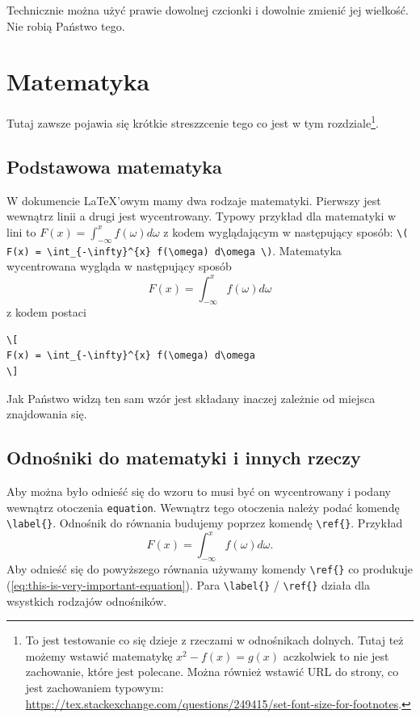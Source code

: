 \documentclass[polish, twoside, 12pt, a4paper]{article}
\theoremstyle{definition}
\theoremstyle{plain}
\theoremstyle{remark}
\begin{document}
Technicznie można użyć prawie dowolnej czcionki i dowolnie zmienić jej wielkość. Nie robią Państwo tego.

\clearpage
\section{Matematyka}

Tutaj zawsze pojawia się krótkie streszzcenie tego co jest w tym rozdziale\footnote{To jest testowanie co się dzieje z rzeczami w odnośnikach dolnych. Tutaj też możemy wstawić matematykę \( x^2 - f(x) = g(x) \) aczkolwiek to nie jest zachowanie, które jest polecane. Można również wstawić URL do strony, co jest zachowaniem typowym: \url{https://tex.stackexchange.com/questions/249415/set-font-size-for-footnotes}.}.

\subsection{Podstawowa matematyka}

W dokumencie \LaTeX'owym mamy dwa rodzaje matematyki. Pierwszy jest wewnątrz linii a drugi jest wycentrowany. Typowy przykład dla matematyki w lini to  \( F(x) = \int_{-\infty}^{x} f(\omega) d\omega \) z kodem wyglądającym w następujący sposób: \verb!\( F(x) = \int_{-\infty}^{x} f(\omega) d\omega \)!. Matematyka wycentrowana wygląda w następujący sposób
\[
F(x) = \int_{-\infty}^{x} f(\omega) d\omega
\]
z kodem postaci
\begin{verbatim}
\[
F(x) = \int_{-\infty}^{x} f(\omega) d\omega
\]
\end{verbatim}
Jak Państwo widzą ten sam wzór jest składany inaczej zależnie od miejsca znajdowania się.

\subsection{Odnośniki do matematyki i innych rzeczy}

Aby można było odnieść się do wzoru to musi być on wycentrowany i podany wewnątrz otoczenia \verb+equation+. Wewnątrz tego otoczenia należy podać komendę \verb+\label{}+. Odnośnik do równania budujemy poprzez komendę \verb+\ref{}+. Przykład
\begin{equation}
\label{eq:this-is-very-important-equation}
F(x) = \int_{-\infty}^{x} f(\omega) d\omega.
\end{equation}
Aby odnieść się do powyższego równania używamy komendy \verb+\ref{}+ co produkuje (\ref{eq:this-is-very-important-equation}). Para \verb+\label{}+ / \verb+\ref{}+ działa dla wsystkich rodzajów odnośników.
\end{document}
